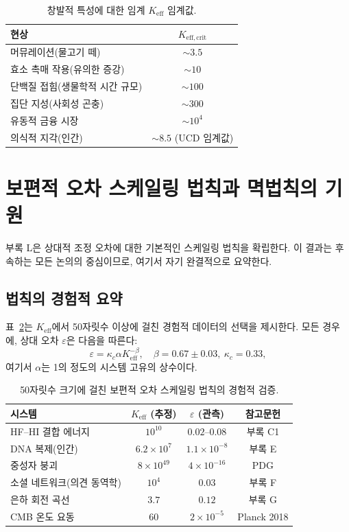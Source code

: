 \documentclass[11pt,a4paper]{article}
\theoremstyle{remark}
\newcommand{\Keff}{K_{\mathrm{eff}}}
\newcommand{\Keffcrit}{K_{\mathrm{eff},\text{crit}}}
\begin{document}
	\begin{table}[H]
		\centering
		\caption{창발적 특성에 대한 임계 \(\Keff\) 임계값.}
		\label{tab:thresholds}
		\begin{tabular}{l c}
			\toprule
			\textbf{현상} & \(\Keffcrit\) \\
			\midrule
			머뮤레이션(물고기 떼) & \(\sim 3.5\) \\
			효소 촉매 작용(유의한 증강) & \(\sim 10\) \\
			단백질 접힘(생물학적 시간 규모) & \(\sim 100\) \\
			집단 지성(사회성 곤충) & \(\sim 300\) \\
			유동적 금융 시장 & \(\sim 10^4\) \\
			의식적 지각(인간) & \(\sim 8.5\) (UCD 임계값) \\
			\bottomrule
		\end{tabular}
	\end{table}
	
	\section{보편적 오차 스케일링 법칙과 멱법칙의 기원}
	\label{sec:scaling}
	
	부록 L은 상대적 조정 오차에 대한 기본적인 스케일링 법칙을 확립한다. 이 결과는 후속하는 모든 논의의 중심이므로, 여기서 자기 완결적으로 요약한다.
	
	\subsection{법칙의 경험적 요약}
	
	표~\ref{tab:scaling_data}는 \(\Keff\)에서 50자릿수 이상에 걸친 경험적 데이터의 선택을 제시한다. 모든 경우에, 상대 오차 \(\varepsilon\)은 다음을 따른다:
	\begin{equation}
		\varepsilon = \kappa_c \alpha \Keff^{-\beta}, \quad \beta = 0.67 \pm 0.03,\ \kappa_c = 0.33,
		\label{eq:error-scaling}
	\end{equation}
	여기서 \(\alpha\)는 1의 정도의 시스템 고유의 상수이다.
	
	\begin{table}[H]
		\centering
		\caption{50자릿수 크기에 걸친 보편적 오차 스케일링 법칙의 경험적 검증.}
		\label{tab:scaling_data}
		\begin{tabular}{l c c c}
			\toprule
			\textbf{시스템} & \(\Keff\) (추정) & \(\varepsilon\) (관측) & 참고문헌 \\
			\midrule
			HF–HI 결합 에너지 & \(10^{10}\) & \(0.02\)--\(0.08\) & 부록 C1 \\
			DNA 복제(인간) & \(6.2\times10^7\) & \(1.1\times10^{-8}\) & 부록 E \\
			중성자 붕괴 & \(8\times10^{49}\) & \(4\times10^{-16}\) & PDG \\
			소셜 네트워크(의견 동역학) & \(10^4\) & \(0.03\) & 부록 F \\
			은하 회전 곡선 & \(3.7\) & \(0.12\) & 부록 G \\
			CMB 온도 요동 & \(60\) & \(2\times10^{-5}\) & Planck 2018 \\
			\bottomrule
		\end{tabular}
	\end{table}
	
\end{document}
